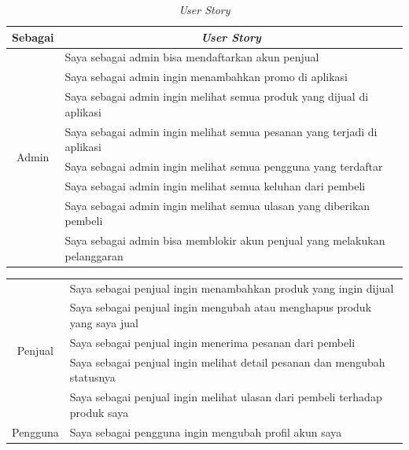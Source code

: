 \begin{table}[H]
	\begin{center}
	\caption{\textit{User Story}}
	\label{tab:user story}
	\begin{tabular}{|c| m{12cm} |}
	\hline
	{\footnotesize Sebagai} & \multicolumn{1}{c|}{{\footnotesize \textit{User Story}}}\\
	\hline
	\multirow{8}{*}{\footnotesize Admin} & {\footnotesize Saya sebagai admin bisa mendaftarkan akun penjual}\\
	\cline{2-2}& {\footnotesize Saya sebagai admin ingin menambahkan promo di aplikasi}\\
	\cline{2-2}& {\footnotesize Saya sebagai admin ingin melihat semua produk yang dijual di aplikasi}\\
	\cline{2-2}& {\footnotesize Saya sebagai admin ingin melihat semua pesanan yang terjadi di aplikasi}\\
	\cline{2-2}& {\footnotesize Saya sebagai admin ingin melihat semua pengguna yang terdaftar}\\
	\cline{2-2}& {\footnotesize Saya sebagai admin ingin melihat semua keluhan dari pembeli}\\
	\cline{2-2}& {\footnotesize Saya sebagai admin ingin melihat semua ulasan yang diberikan pembeli}\\
	\cline{2-2}& {\footnotesize Saya sebagai admin bisa memblokir akun penjual yang melakukan pelanggaran}\\
	\hline
	\end{tabular}
	\end{center}
\end{table}

\newpage

\addtocounter{table}{-1}
\begin{table}[H]
	\begin{center}
	\begin{tabular}{|c| m{12cm} |}
	\hline
	\multirow{5}{*}{\footnotesize Penjual} & {\footnotesize Saya sebagai penjual ingin menambahkan produk yang ingin dijual}\\
	\cline{2-2}& {\footnotesize Saya sebagai penjual ingin mengubah atau menghapus produk yang saya jual}\\
	\cline{2-2}& {\footnotesize Saya sebagai penjual ingin menerima pesanan dari pembeli}\\
	\cline{2-2}& {\footnotesize Saya sebagai penjual ingin melihat detail pesanan dan mengubah statusnya}\\
	\cline{2-2}& {\footnotesize Saya sebagai penjual ingin melihat ulasan dari pembeli terhadap produk saya}\\
	\hline
	{\footnotesize Pengguna} & {\footnotesize Saya sebagai pengguna ingin mengubah profil akun saya}\\
	\hline
	\end{tabular}
	\end{center}
\end{table}

